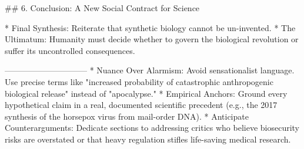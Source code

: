 ## 6. Conclusion: A New Social Contract for Science

* Final Synthesis: Reiterate that synthetic biology cannot be un-invented.
* The Ultimatum: Humanity must decide whether to govern the biological revolution or suffer its uncontrolled consequences.

------------------------------
* Nuance Over Alarmism: Avoid sensationalist language. Use precise terms like "increased probability of catastrophic anthropogenic biological release" instead of "apocalypse."
* Empirical Anchors: Ground every hypothetical claim in a real, documented scientific precedent (e.g., the 2017 synthesis of the horsepox virus from mail-order DNA).
* Anticipate Counterarguments: Dedicate sections to addressing critics who believe biosecurity risks are overstated or that heavy regulation stifles life-saving medical research.
